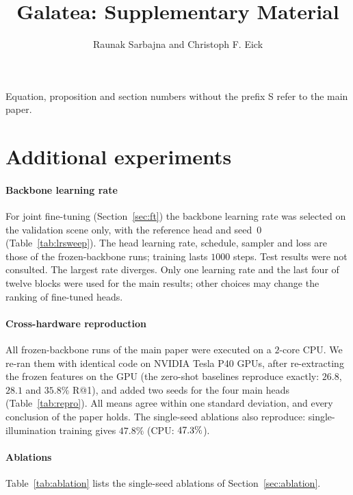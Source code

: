 \documentclass[letterpaper,journal]{IEEEtran}
\begin{document}
\renewcommand{\thefigure}{S\arabic{figure}}\renewcommand{\thetable}{S\Roman{table}}\renewcommand{\thesection}{S\Roman{section}}
\title{Galatea: Supplementary Material}
\author{Raunak Sarbajna and Christoph F. Eick}
\maketitle
\noindent Equation, proposition and section numbers without the prefix S refer to the main paper.




\section{Additional experiments}
\paragraph*{Backbone learning rate} For joint fine-tuning (Section~\ref{sec:ft}) the backbone learning rate was
selected on the validation scene only, with the reference head and seed~0 (Table~\ref{tab:lrsweep}). The head
learning rate, schedule, sampler and loss are those of the frozen-backbone runs; training lasts $1000$ steps.
Test results were not consulted. The largest rate diverges. Only one learning rate and the last four of
twelve blocks were used for the main results; other choices may change the ranking of fine-tuned heads.


\paragraph*{Cross-hardware reproduction} All frozen-backbone runs of the main paper were executed on a
$2$-core CPU. We re-ran them with identical code on NVIDIA Tesla P40 GPUs, after re-extracting the frozen
features on the GPU (the zero-shot baselines reproduce exactly: $26.8$, $28.1$ and $35.8\%$ R@1), and
added two seeds for the four main heads (Table~\ref{tab:repro}). All means agree within one standard deviation,
and every conclusion of the paper holds. The single-seed ablations also reproduce: single-illumination
training gives $47.8\%$ (CPU: $47.3\%$).


\paragraph*{Ablations} Table~\ref{tab:ablation} lists the single-seed ablations of Section~\ref{sec:ablation}.


\end{document}
